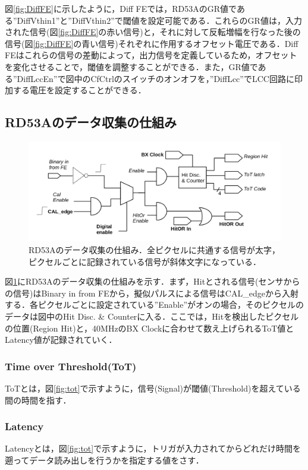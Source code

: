 図\ref{fig:DiffFE}に示したように，Diff FEでは，RD53AのGR値である''DiffVthin1''と''DiffVthin2''で閾値を設定可能である．これらのGR値は，入力された信号(図\ref{fig:DiffFE}の赤い信号)と，それに対して反転増幅を行なった後の信号(図\ref{fig:DiffFE}の青い信号)それぞれに作用するオフセット電圧である．Diff FEはこれらの信号の差動によって，出力信号を定義しているため，オフセットを変化させることで，閾値を調整することができる．また，GR値である''DiffLccEn''で図中のCfCtrlのスイッチのオンオフを，''DiffLcc''でLCC回路に印加する電圧を設定することができる．

\subsection{RD53Aのデータ収集の仕組み}

\begin{figure}[h]
  \centering
  \includegraphics[width=13cm]{./figure/RD53Aproc.png}
  \caption{RD53Aのデータ収集の仕組み．全ピクセルに共通する信号が太字，ピクセルごとに記録されている信号が斜体文字になっている．\cite{Garcia-Sciveres:2287593}}
  \label{fig:RD53Aproc}
\end{figure}

図\ref{fig:RD53Aproc}にRD53Aのデータ収集の仕組みを示す．まず，Hitとされる信号(センサからの信号)はBinary in from FEから，擬似パルスによる信号はCAL\_edgeから入射する．各ピクセルごとに設定されている''Enable''がオンの場合，そのピクセルのデータは図中のHit Disc. \& Counterに入る．ここでは，Hitを検出したピクセルの位置(Region Hit)と，40$\mathrm{MHz}$のBX Clockに合わせて数え上げられるToT値とLatency値が記録されていく．

\subsubsection*{Time over Threshold(ToT)}
ToTとは，図\ref{fig:tot}で示すように，信号(Signal)が閾値(Threshold)を超えている間の時間を指す．

\subsubsection*{Latency}
Latencyとは，図\ref{fig:tot}で示すように，トリガが入力されてからどれだけ時間を遡ってデータ読み出しを行うかを指定する値をさす．

